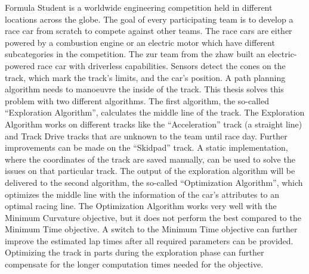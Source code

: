 Formula Student is a worldwide engineering competition held in different locations across the globe. The goal of every participating team is to develop a race car from scratch to compete against other teams. The race cars are either powered by a combustion engine or an electric motor which have different subcategories in the competition. The \acrlong{zur} team from the \acrlong{zhaw} built an electric-powered race car with driverless capabilities. Sensors detect the cones on the track, which mark the track's limits, and the car's position. A path planning algorithm needs to manoeuvre the inside of the track. This thesis solves this problem with two different algorithms. The first algorithm, the so-called ``Exploration Algorithm'', calculates the middle line of the track. The Exploration Algorithm works on different tracks like the ``Acceleration'' track (a straight line) and Track Drive tracks that are unknown to the team until race day.
Further improvements can be made on the ``Skidpad'' track. A static implementation, where the coordinates of the track are saved manually, can be used to solve the issues on that particular track. The output of the exploration algorithm will be delivered to the second algorithm, the so-called ``Optimization Algorithm'', which optimizes the middle line with the information of the car's attributes to an optimal racing line. The Optimization Algorithm works very well with the Minimum Curvature objective, but it does not perform the best compared to the Minimum Time objective. A switch to the Minimum Time objective can further improve the estimated lap times after all required parameters can be provided. Optimizing the track in parts during the exploration phase can further compensate for the longer computation times needed for the objective.